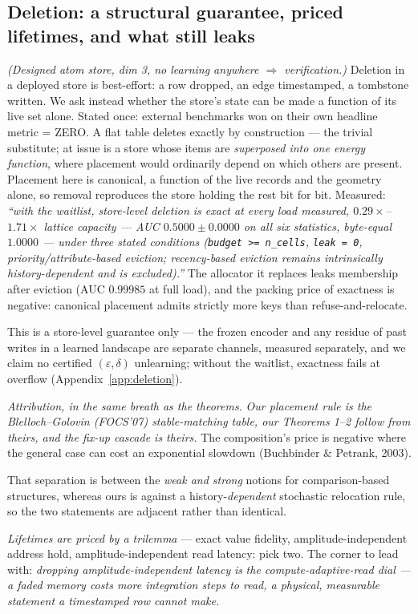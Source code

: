 \documentclass{article}
\begin{document}
\subsection{Deletion: a structural guarantee, priced lifetimes, and what still leaks}\label{sec:deletion}

\emph{(Designed atom store, dim 3, no learning anywhere $\Rightarrow$ verification.)} Deletion in a deployed store is best-effort: a row dropped, an edge timestamped, a tombstone written. We ask instead whether the store's state can be made a function of its live set alone. Stated once: external benchmarks won on their own headline metric = ZERO. A flat table deletes exactly by construction --- the trivial substitute; at issue is a store whose items are \emph{superposed into one energy function}, where placement would ordinarily depend on which others are present. Placement here is canonical, a function of the live records and the geometry alone, so removal reproduces the store holding the rest bit for bit. Measured: \emph{``with the waitlist, store-level deletion is exact at every load measured, $0.29\times$--$1.71\times$ lattice capacity --- AUC $0.5000\pm0.0000$ on all six statistics, byte-equal $1.0000$ --- under three stated conditions (\texttt{budget >= n\_cells}, \texttt{leak = 0}, priority/attribute-based eviction; recency-based eviction remains intrinsically history-dependent and is excluded).''} The allocator it replaces leaks membership after eviction (AUC $0.99985$ at full load), and the packing price of exactness is negative: canonical placement admits strictly more keys than refuse-and-relocate. { This is a store-level guarantee only --- the frozen encoder and any residue of past writes in a learned landscape are separate channels, measured separately, and we claim no certified $(\varepsilon,\delta)$ unlearning; without the waitlist, exactness fails at overflow (Appendix~\ref{app:deletion}).\par} \emph{Attribution, in the same breath as the theorems.} \emph{Our placement rule is the Blelloch--Golovin (FOCS'07) stable-matching table, our Theorems 1--2 follow from theirs, and the fix-up cascade is theirs.} The composition's price is negative where the general case can cost an exponential slowdown (Buchbinder \& Petrank, 2003). { That separation is between the \emph{weak and strong} notions for comparison-based structures, whereas ours is against a history-\emph{dependent} stochastic relocation rule, so the two statements are adjacent rather than identical.\par} \emph{Lifetimes are priced by a trilemma} --- exact value fidelity, amplitude-independent address hold, amplitude-independent read latency: pick two. The corner to lead with: \emph{dropping amplitude-independent latency} \emph{is} \emph{the compute-adaptive-read dial --- a faded memory costs more integration steps to read, a physical, measurable statement a timestamped row cannot make.}
\end{document}
